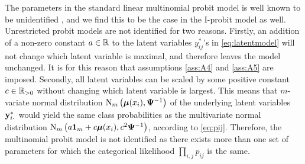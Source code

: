 The parameters in the standard linear multinomial probit model is well known to be unidentified \citep{Keane1992,train2009discrete}, and we find this to be the case in the I-probit model as well.
Unrestricted probit models are not identified for two reasons.
Firstly, an addition of a non-zero constant $a\in\mathbb{R}$ to the latent variables $y_{ij}^*$'s in \cref{eq:latentmodel} will not change which latent variable is maximal, and therefore leaves the model unchanged.
It is for this reason that assumptions \ref{ass:A4} and \ref{ass:A5} are imposed.
Secondly, all latent variables can be scaled by some positive constant $c\in\mathbb{R}_{>0}$ without changing which latent variable is largest.
This means that $m$-variate normal distribution $\operatorname{N}_m\big({\bm\mu}(x_i), {\bm\Psi}^{-1}\big)$ of the underlying latent variables $\by_{i\bigcdot}^*$ would yield the same class probabilities as the multivariate normal distribution $\operatorname{N}_m\big( a{\mathbf 1}_m + c{\bm\mu}(x_i), c^2{\bm\Psi}^{-1} \big)$, according to \cref{eq:pij}.
Therefore, the multinomial probit model is not identified as there exists more than one set of parameters for which the categorical likelihood $\prod_{i,j} p_{ij}$ is the same.

